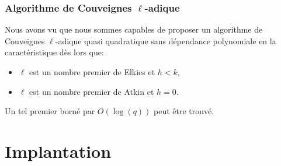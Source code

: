 \documentclass[10pt,a4paper]{beamer}
\theoremstyle{plain}
\theoremstyle{definition}
\theoremstyle{definition}
\theoremstyle{definition}
\theoremstyle{definition}
\theoremstyle{remark}
\theoremstyle{remark}
\begin{document}

\begin{frame}
\frametitle{Algorithme de Couveignes $\ell$-adique}

Nous avons vu que nous sommes capables de proposer un algorithme de Couveignes $\ell$-adique quasi quadratique sans dépendance polynomiale en la caractéristique dès lors que:
\begin{itemize}
\item $\ell$ est un nombre premier de Elkies et $h<k$, 
\item $\ell$ est un nombre premier de Atkin et $h=0$.
\end{itemize}
Un tel premier borné par $O(\log(q))$ peut être trouvé.
\end{frame}

\section{Implantation}
\end{document}
